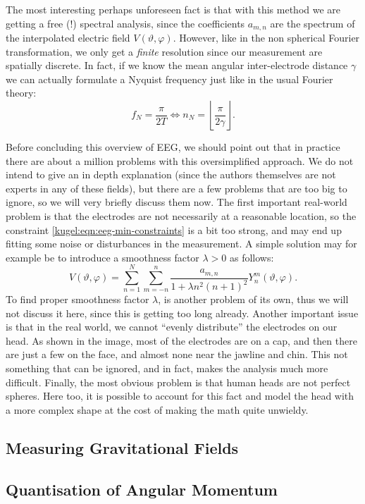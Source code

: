 The most interesting perhaps unforeseen fact is that with this method we are
getting a free (!) spectral analysis, since the coefficients $a_{m,n}$ are the
spectrum of the interpolated electric field $V(\vartheta, \varphi)$. However,
like in the non spherical Fourier transformation, we only get a \emph{finite}
resolution since our measurement are spatially discrete. In fact, if we know the
mean angular inter-electrode distance $\gamma$ we can actually formulate a
Nyquist frequency just like in the usual Fourier theory:
\begin{equation}
  f_N = \frac{\pi}{2T}
  \iff
  n_N = \left\lfloor \frac{\pi}{2\gamma} \right\rfloor.
\end{equation}

Before concluding this overview of EEG, we should point out that in practice
there are about a million problems with this oversimplified approach. We do not
intend to give an in depth explanation (since the authors themselves are not
experts in any of these fields), but there are a few problems that are too big
to ignore, so we will very briefly discuss them now. The first important
real-world problem is that the electrodes are not necessarily at a reasonable
location, so the constraint \eqref{kugel:eqn:eeg-min-constraints} is a bit too
strong, and may end up fitting some noise or disturbances in the measurement. A
simple solution may for example be to introduce a smoothness factor $\lambda >
0$ as follows:
\begin{equation}
  V(\vartheta, \varphi) = \sum_{n=1}^N \sum_{m=-n}^n 
    \frac{a_{m,n}}{1 + \lambda n^2(n+1)^2} Y^m_n(\vartheta, \varphi).
\end{equation}
To find proper smoothness factor $\lambda$, is another problem of its own, thus
we will not discuss it here, since this is getting too long already. Another
important issue is that in the real world, we cannot ``evenly distribute'' the
electrodes on our head. As shown in the image, most of the electrodes are on a
cap, and then there are just a few on the face, and almost none near the jawline
and chin. This not something that can be ignored, and in fact, makes the
analysis much more difficult. Finally, the most obvious problem is that human
heads are not perfect spheres. Here too, it is possible to account for this fact
and model the head with a more complex shape at the cost of making the math
quite unwieldy.

\subsection{Measuring Gravitational Fields}

\subsection{Quantisation of Angular Momentum}
